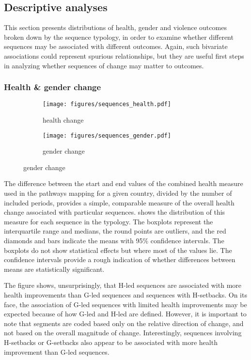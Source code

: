 \documentclass[12pt]{article}
\begin{document}

\subsection{Descriptive analyses}

This section presents distributions of health, gender and violence outcomes broken down by the sequence typology, in order to examine whether different sequences may be associated with different outcomes. Again, such bivariate associations could represent spurious relationships, but they are useful first steps in analyzing whether sequences of change may matter to outcomes.

\subsubsection{Health \& gender change}

\begin{figure}[htbp]
  \centering
  \caption{Distributions of health and gender change per period by sequence (1975-2015)}
  \label{sequences_health_gender}
  \begin{subfigure}[b]{\textwidth}
    \caption{health change}
    \label{sequences_health}
    \texttt{[image: figures/sequences\_health.pdf]}
  \end{subfigure}
  \begin{subfigure}[b]{\textwidth}
    \caption{gender change}
    \label{sequences_gender}
    \texttt{[image: figures/sequences\_gender.pdf]}
  \end{subfigure}
\end{figure}

The difference between the start and end values of the combined health measure used in the pathways mapping for a given country, divided by the number of included periods, provides a simple, comparable measure of the overall health change associated with particular sequences.
 shows the distribution of this measure for each sequence in the typology.
The boxplots represent the interquartile range and medians, the round points are outliers, and the red diamonds and bars indicate the means with 95\% confidence intervals.
The boxplots do not show statistical effects but where most of the values lie.
The confidence intervals provide a rough indication of whether differences between means are statistically significant.

The figure shows, unsurprisingly, that H-led sequences are associated with more health improvements than G-led sequences and sequences with H-setbacks.
On its face, the association of G-led sequences with limited health improvements may be expected because of how G-led and H-led are defined.
However, it is important to note that segments are coded based only on the relative direction of change, and not based on the overall magnitude of change.
Interestingly, sequences involving H-setbacks or G-setbacks also appear to be associated with more health improvement than G-led sequences.
\end{document}
